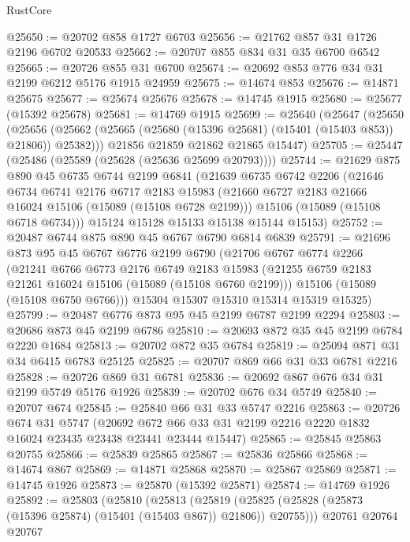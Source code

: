 \begin{lexlean}{RustCore}
\begin{coremodule}
@25650 := @20702 @858 @1727 @6703
@25656 := @21762 @857 @31 @1726 @2196 @6702 @20533
@25662 := @20707 @855 @834 @31 @35 @6700 @6542
@25665 := @20726 @855 @31 @6700
@25674 := @20692 @853 @776 @34 @31 @2199 @6212 @5176 @1915 @24959
@25675 := @14674 @853
@25676 := @14871 @25675
@25677 := @25674 @25676
@25678 := @14745 @1915
@25680 := @25677 (@15392 @25678)
@25681 := @14769 @1915
@25699 := @25640
    (@25647
      (@25650
        (@25656 (@25662 (@25665 (@25680 (@15396 @25681) (@15401 (@15403 @853)) @21806)) @25382)))
      @21856
      @21859
      @21862
      @21865
      @15447)
@25705 := @25447 (@25486 (@25589 (@25628 (@25636 @25699 @20793))))
@25744 := @21629
    @875
    @890
    @45
    @6735
    @6744
    @2199
    @6841
    (@21639
      @6735
      @6742
      @2206
      (@21646
        @6734
        @6741
        @2176
        @6717
        @2183
        @15983
        (@21660 @6727 @2183 @21666 @16024 @15106 (@15089 (@15108 @6728 @2199)))
        @15106
        (@15089 (@15108 @6718 @6734)))
      @15124
      @15128
      @15133
      @15138
      @15144
      @15153)
@25752 := @20487 @6744 @875 @890 @45 @6767 @6790 @6814 @6839
@25791 := @21696
    @873
    @95
    @45
    @6767
    @6776
    @2199
    @6790
    (@21706
      @6767
      @6774
      @2266
      (@21241
        @6766
        @6773
        @2176
        @6749
        @2183
        @15983
        (@21255 @6759 @2183 @21261 @16024 @15106 (@15089 (@15108 @6760 @2199)))
        @15106
        (@15089 (@15108 @6750 @6766)))
      @15304
      @15307
      @15310
      @15314
      @15319
      @15325)
@25799 := @20487 @6776 @873 @95 @45 @2199 @6787 @2199 @2294
@25803 := @20686 @873 @45 @2199 @6786
@25810 := @20693 @872 @35 @45 @2199 @6784 @2220 @1684
@25813 := @20702 @872 @35 @6784
@25819 := @25094 @871 @31 @34 @6415 @6783 @25125
@25825 := @20707 @869 @66 @31 @33 @6781 @2216
@25828 := @20726 @869 @31 @6781
@25836 := @20692 @867 @676 @34 @31 @2199 @5749 @5176 @1926
@25839 := @20702 @676 @34 @5749
@25840 := @20707 @674
@25845 := @25840 @66 @31 @33 @5747 @2216
@25863 := @20726
    @674
    @31
    @5747
    (@20692 @672 @66 @33 @31 @2199 @2216 @2220 @1832 @16024 @23435 @23438 @23441 @23444 @15447)
@25865 := @25845 @25863 @20755
@25866 := @25839 @25865
@25867 := @25836 @25866
@25868 := @14674 @867
@25869 := @14871 @25868
@25870 := @25867 @25869
@25871 := @14745 @1926
@25873 := @25870 (@15392 @25871)
@25874 := @14769 @1926
@25892 := @25803
    (@25810
      (@25813
        (@25819 (@25825 (@25828 (@25873 (@15396 @25874) (@15401 (@15403 @867)) @21806)) @20755)))
      @20761
      @20764
      @20767

\end{coremodule}
\end{lexlean}
